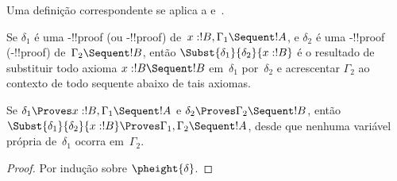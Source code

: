\documentclass[../../../include/open-logic-section]{subfiles}
\begin{document}
Uma definição correspondente se aplica a  e~.

\begin{defn}
Se $\delta_1$ é uma -!!{proof} (ou -!!{proof})
de~$x:!B, \Gamma_1 \Sequent !A$, e $\delta_2$ é uma
-!!{proof} (-!!{proof}) de~$\Gamma_2 \Sequent !B$,
então $\Subst{\delta_1}{\delta_2}{x:!B}$ é o resultado de substituir
todo axioma $x:!B \Sequent !B$ em~$\delta_1$ por~$\delta_2$ e acrescentar
$\Gamma_2$ ao contexto de todo sequente abaixo de tais axiomas.
\end{defn}

\begin{prop}
Se $\delta_1 \Proves x:!B, \Gamma_1 \Sequent
!A$ e $\delta_2 \Proves \Gamma_2 \Sequent !B$, então
$\Subst{\delta_1}{\delta_2}{x:!B} \Proves \Gamma_1, \Gamma_2 \Sequent
!A$, desde que nenhuma variável própria de~$\delta_1$ ocorra em~$\Gamma_2$.
\end{prop}


\begin{proof}
  Por indução sobre $\pheight{\delta}$.
\end{proof}
\end{document}
